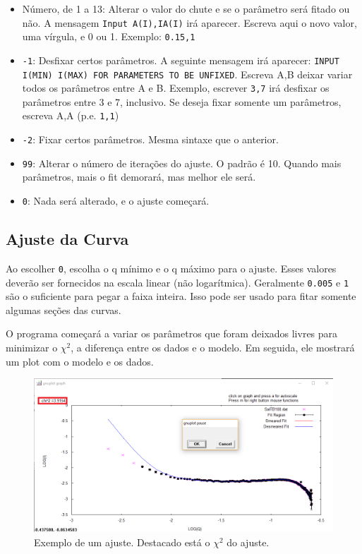\begin{apendicesenv}
\begin{itemize}
	\item Número, de 1 a 13: Alterar o valor do chute e se o parâmetro será fitado ou não. A mensagem \texttt{Input A(I),IA(I)} irá aparecer. Escreva aqui o novo valor, uma vírgula, e 0 ou 1. Exemplo: \texttt{0.15,1}
	\item \texttt{-1}: Desfixar certos parâmetros. A seguinte mensagem irá aparecer: \texttt{INPUT I(MIN) I(MAX) FOR PARAMETERS TO BE UNFIXED}. Escreva A,B deixar variar todos os parâmetros entre A e B. Exemplo, escrever \texttt{3,7} irá desfixar os parâmetros entre 3 e 7, inclusivo. Se deseja fixar somente um parâmetros, escreva A,A (p.e. \texttt{1,1})
	\item \texttt{-2}: Fixar certos parâmetros. Mesma sintaxe que o anterior.
	\item \texttt{99}: Alterar o número de iterações do ajuste. O padrão é 10. Quando mais parâmetros, mais o fit demorará, mas melhor ele será.
	\item \texttt{0}: Nada será alterado, e o ajuste começará.
\end{itemize}

\subsection{Ajuste da Curva}
Ao escolher \texttt{0}, escolha o q mínimo e o q máximo para o ajuste. Esses valores deverão ser fornecidos na escala linear (não logarítmica). Geralmente \texttt{0.005} e \texttt{1} são o suficiente para pegar a faixa inteira. Isso pode ser usado para fitar somente algumas seções das curvas.

O programa começará a variar os parâmetros que foram deixados livres para minimizar o \(\chi^2\), a diferença entre os dados e o modelo. Em seguida, ele mostrará um plot com o modelo e os dados.

\begin{figure}[h]
	\centering
	\includegraphics[scale=0.5]{./imagens/saxs/supersaxs_gnuplot_fit}
	\caption{Exemplo de um ajuste. Destacado está o \(\chi^2\) do ajuste.}
\end{figure}


\end{apendicesenv}
